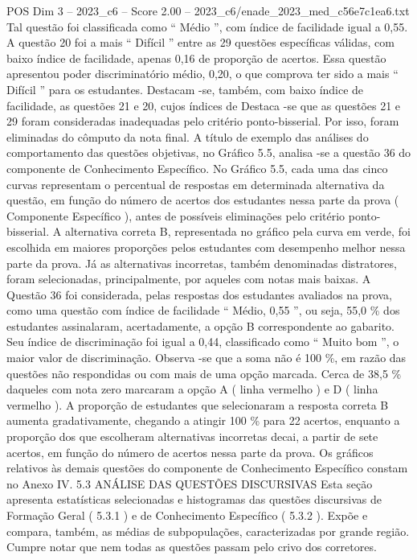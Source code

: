 \begin{textsample}{POS Dim 3 – 2023\_c6 – Score 2.00 – 2023\_c6/enade\_2023\_med\_c56e7c1ea6.txt}
Tal questão foi classificada como “ Médio ”, com índice de facilidade igual a 0,55.
A questão 20 foi a mais “ Difícil ” entre as 29 questões específicas válidas, com baixo índice de facilidade, apenas 0,16 de proporção de acertos.
Essa questão apresentou poder discriminatório médio, 0,20, o que comprova ter sido a mais “ Difícil ” para os estudantes.
Destacam -se, também, com baixo índice de facilidade, as questões 21 e 20, cujos índices de Destaca -se que as questões 21 e 29 foram consideradas inadequadas pelo critério ponto-bisserial.
Por isso, foram eliminadas do cômputo da nota final.
A título de exemplo das análises do comportamento das questões objetivas, no Gráfico 5.5, analisa -se a questão 36 do componente de Conhecimento Específico.
No Gráfico 5.5, cada uma das cinco curvas representam o percentual de respostas em determinada alternativa da questão, em função do número de acertos dos estudantes nessa parte da prova ( Componente Específico ), antes de possíveis eliminações pelo critério ponto-bisserial.
A alternativa correta B, representada no gráfico pela curva em verde, foi escolhida em maiores proporções pelos estudantes com desempenho melhor nessa parte da prova.
Já as alternativas incorretas, também denominadas distratores, foram selecionadas, principalmente, por aqueles com notas mais baixas.
A Questão 36 foi considerada, pelas respostas dos estudantes avaliados na prova, como uma questão com índice de facilidade “ Médio, 0,55 ”, ou seja, 55,0 \% dos estudantes assinalaram, acertadamente, a opção B correspondente ao gabarito.
Seu índice de discriminação foi igual a 0,44, classificado como “ Muito bom ”, o maior valor de discriminação.
Observa -se que a soma não é 100 \%, em razão das questões não respondidas ou com mais de uma opção marcada.
Cerca de 38,5 \% daqueles com nota zero marcaram a opção A ( linha vermelho ) e D ( linha vermelho ).
A proporção de estudantes que selecionaram a resposta correta B aumenta gradativamente, chegando a atingir 100 \% para 22 acertos, enquanto a proporção dos que escolheram alternativas incorretas decai, a partir de sete acertos, em função do número de acertos nessa parte da prova.
Os gráficos relativos às demais questões do componente de Conhecimento Específico constam no Anexo IV. 5.3 ANÁLISE DAS QUESTÕES DISCURSIVAS Esta seção apresenta estatísticas selecionadas e histogramas das questões discursivas de Formação Geral ( 5.3.1 ) e de Conhecimento Específico ( 5.3.2 ).
Expõe e compara, também, as médias de subpopulações, caracterizadas por grande região.
Cumpre notar que nem todas as questões passam pelo crivo dos corretores.

\end{textsample}
